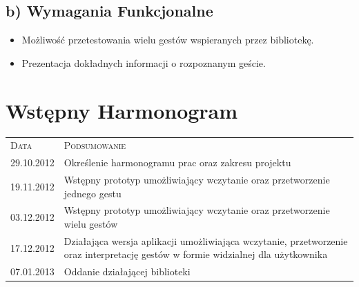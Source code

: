 \documentclass[a4paper,12pt]{article}
\begin{document}
	\subsection*{b) Wymagania Funkcjonalne}
	\begin{itemize}
		\item Możliwość przetestowania wielu gestów wspieranych przez bibliotekę.
		\item Prezentacja dokładnych informacji o rozpoznanym geście.
	\end{itemize}

	
\section{\Large Wstępny Harmonogram}
\begin{tabular}{l p{10cm}}
	\textsc{Data} & \textsc{Podsumowanie} \\[0.1cm]
	 29.10.2012   &  Określenie harmonogramu prac oraz zakresu projektu\\[0.1cm]
	 19.11.2012   &  Wstępny prototyp umożliwiający wczytanie oraz przetworzenie jednego gestu\\[0.1cm]
	 03.12.2012   &  Wstępny prototyp umożliwiający wczytanie oraz przetworzenie wielu gestów\\[0.1cm] 
	 17.12.2012   &  Działająca wersja aplikacji umożliwiająca wczytanie, przetworzenie oraz interpretację gestów w formie widzialnej dla użytkownika\\[0.1cm]
	 07.01.2013   &  Oddanie działającej biblioteki
\end{tabular}
\end{document}
